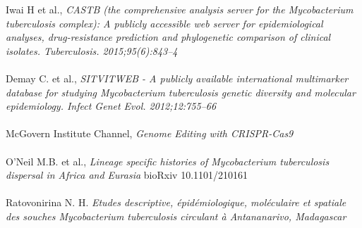 \documentclass[twoside,a4paper,11pt,frenchb,openany]{report}
\begin{document}
\begin{thebibliography}{10}
Iwai H et al., \textit{CASTB (the comprehensive analysis server for the Mycobacterium tuberculosis complex): A publicly accessible web server for epidemiological analyses, drug-resistance prediction and phylogenetic comparison of clinical isolates. Tuberculosis. 2015;95(6):843–4}\\ \\

Demay C. et al., \textit{SITVITWEB - A publicly available international multimarker database for studying Mycobacterium tuberculosis genetic diversity and molecular epidemiology. Infect Genet Evol. 2012;12:755–66}\\ \\

\bibitem{}McGovern Institute Channel, \textit{Genome Editing with CRISPR-Cas9}\\ \\

O'Neil M.B. et al., \textit{Lineage specific histories of Mycobacterium tuberculosis dispersal in Africa and Eurasia}
bioRxiv 10.1101/210161\\ \\

Ratovonirina N. H. \textit{Etudes descriptive, épidémiologique, moléculaire et spatiale des souches Mycobacterium tuberculosis circulant à Antananarivo, Madagascar}

\end{thebibliography}
\end{document}
